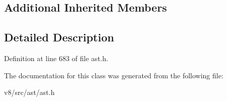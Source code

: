 \subsection*{Additional Inherited Members}


\subsection{Detailed Description}


Definition at line 683 of file ast.\+h.



The documentation for this class was generated from the following file\+:\begin{DoxyCompactItemize}
\item 
v8/src/ast/ast.\+h\end{DoxyCompactItemize}
